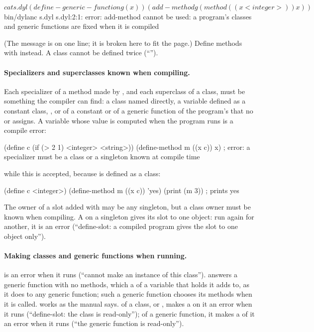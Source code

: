 \begin{shell}
$ cat s.dyl
(define-generic-function g (x))
(add-method g (method ((x <integer>)) x))
$ bin/dylanc s.dyl
s.dyl:2:1: error: add-method cannot be used: a program's classes and
generic functions are fixed when it is compiled
\end{shell}

(The message is on one line; it is broken here to fit the page.)
Define methods with  instead. A class cannot be defined twice
(``'').

\paragraph{Specializers and superclasses known when compiling.}
Each specializer of a method made by , and each
superclass of a class, must be something the compiler can find: a class
named directly, a variable defined as a constant class, , or  of a constant or
of a generic function of the program's that no  or
 assigns.
A variable whose value is computed when the program runs is a compile
error:

\begin{dylan}
(define c (if (> 2 1) <integer> <string>))
(define-method m ((x c)) x)
; error: a specializer must be a class or a singleton known at compile time
\end{dylan}

\noindent while this is accepted, because  is defined as a class:

\begin{dylan}
(define c <integer>)
(define-method m ((x c)) 'yes)
(print (m 3))        ; prints yes
\end{dylan}

The owner of a slot added with  may be any singleton,
but a class owner must be known when compiling. A  on
a singleton gives its slot to one object: run again for another, it is
an error (``define-slot: a compiled program gives the slot 
to one object only'').

\paragraph{Making classes and generic functions when running.}
 is an error when it runs (``cannot make an
instance of this class''). 
answers a generic function with no methods, which a 
of a variable that holds it adds to, as it does to any generic function;
such a generic function chooses its methods when it is called. 
works as the manual says.  of a class, or
, makes a  on it an error when it runs
(``define-slot: the class is read-only''); of a generic function, it
makes a  of it an error when it runs (``the generic
function is read-only'').

